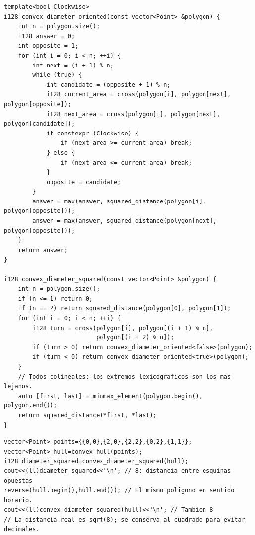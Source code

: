 \begin{lstlisting}[style=cpp]
template<bool Clockwise>
i128 convex_diameter_oriented(const vector<Point> &polygon) {
    int n = polygon.size();
    i128 answer = 0;
    int opposite = 1;
    for (int i = 0; i < n; ++i) {
        int next = (i + 1) % n;
        while (true) {
            int candidate = (opposite + 1) % n;
            i128 current_area = cross(polygon[i], polygon[next], polygon[opposite]);
            i128 next_area = cross(polygon[i], polygon[next], polygon[candidate]);
            if constexpr (Clockwise) {
                if (next_area >= current_area) break;
            } else {
                if (next_area <= current_area) break;
            }
            opposite = candidate;
        }
        answer = max(answer, squared_distance(polygon[i], polygon[opposite]));
        answer = max(answer, squared_distance(polygon[next], polygon[opposite]));
    }
    return answer;
}

i128 convex_diameter_squared(const vector<Point> &polygon) {
    int n = polygon.size();
    if (n <= 1) return 0;
    if (n == 2) return squared_distance(polygon[0], polygon[1]);
    for (int i = 0; i < n; ++i) {
        i128 turn = cross(polygon[i], polygon[(i + 1) % n],
                          polygon[(i + 2) % n]);
        if (turn > 0) return convex_diameter_oriented<false>(polygon);
        if (turn < 0) return convex_diameter_oriented<true>(polygon);
    }
    // Todos colineales: los extremos lexicograficos son los mas lejanos.
    auto [first, last] = minmax_element(polygon.begin(), polygon.end());
    return squared_distance(*first, *last);
}
\end{lstlisting}

\begin{lstlisting}[style=cpp]
vector<Point> points={{0,0},{2,0},{2,2},{0,2},{1,1}};
vector<Point> hull=convex_hull(points);
i128 diameter_squared=convex_diameter_squared(hull);
cout<<(ll)diameter_squared<<'\n'; // 8: distancia entre esquinas opuestas
reverse(hull.begin(),hull.end()); // El mismo poligono en sentido horario.
cout<<(ll)convex_diameter_squared(hull)<<'\n'; // Tambien 8
// La distancia real es sqrt(8); se conserva al cuadrado para evitar decimales.
\end{lstlisting}

